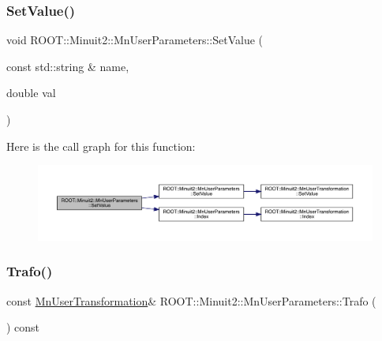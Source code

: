 \subsubsection{\texorpdfstring{SetValue()}{SetValue()}\hspace{0.1cm}{\footnotesize\ttfamily [4/4]}}
{\footnotesize\ttfamily void R\+O\+O\+T\+::\+Minuit2\+::\+Mn\+User\+Parameters\+::\+Set\+Value (\begin{DoxyParamCaption}\item[{const std\+::string \&}]{name,  }\item[{double}]{val }\end{DoxyParamCaption})}

Here is the call graph for this function\+:\nopagebreak
\begin{figure}[H]
\begin{center}
\leavevmode
\includegraphics[width=350pt]{d6/d10/classROOT_1_1Minuit2_1_1MnUserParameters_a83c0197f87bd6722f0ddfed4bf406fbe_cgraph}
\end{center}
\end{figure}
\mbox{\label{classROOT_1_1Minuit2_1_1MnUserParameters_ac5c3bff96b6fc41a790005f524e334db}} 
\subsubsection{\texorpdfstring{Trafo()}{Trafo()}\hspace{0.1cm}{\footnotesize\ttfamily [1/2]}}
{\footnotesize\ttfamily const \mbox{\hyperlink{classROOT_1_1Minuit2_1_1MnUserTransformation}{Mn\+User\+Transformation}}\& R\+O\+O\+T\+::\+Minuit2\+::\+Mn\+User\+Parameters\+::\+Trafo (\begin{DoxyParamCaption}{ }\end{DoxyParamCaption}) const\hspace{0.3cm}{\ttfamily [inline]}}

\mbox{\label{classROOT_1_1Minuit2_1_1MnUserParameters_ac5c3bff96b6fc41a790005f524e334db}} 
